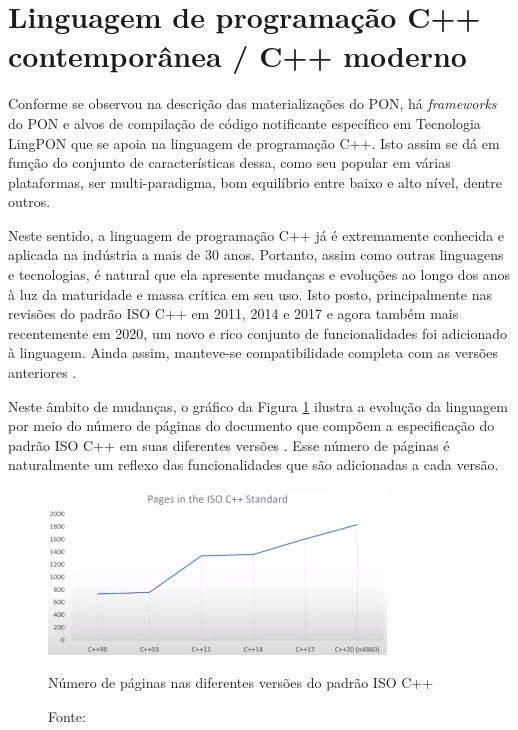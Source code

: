 \section{Linguagem de programação C++ contemporânea / C++ moderno}\label{sec:cpp_moderno}

Conforme se observou na descrição das materializações do PON, há
\textit{frameworks} do PON e alvos de compilação de código notificante
específico em Tecnologia LingPON que se apoia na linguagem de programação C++.
Isto assim se dá em função do conjunto de características dessa, como seu
popular em várias plataformas, ser multi-paradigma, bom equilíbrio entre baixo e
alto nível, dentre outros.

Neste sentido, a linguagem de programação C++ já é extremamente conhecida e
aplicada na indústria a mais de 30 anos. Portanto, assim como outras linguagens
e tecnologias, é natural que ela apresente mudanças e evoluções ao longo dos
anos à luz da maturidade e massa crítica em seu uso. Isto posto, principalmente
nas revisões do padrão ISO C++ em 2011, 2014 e 2017 e agora também mais
recentemente em 2020, um novo e rico conjunto de funcionalidades foi adicionado
à linguagem. Ainda assim, manteve-se compatibilidade completa com as versões
anteriores \cite{bjarne_2020}.

Neste âmbito de mudanças, o gráfico da Figura \ref{fig:iso_cpp} ilustra a
evolução da linguagem por meio do número de páginas do documento que compõem a
especificação do padrão ISO C++ em suas diferentes versões
\cite{iso_cpp17,feldman_2019}. Esse número de páginas é naturalmente um reflexo
das funcionalidades que são adicionadas a cada versão.

\begin{figure}[!htb]
  \centering
  \includegraphics[width=0.8\textwidth]{../figures/iso_cpp.png}
  \smallskip
  \caption{Número de páginas nas diferentes versões do padrão ISO C++}
  \caption*{Fonte: }
  \label{fig:iso_cpp}
\end{figure}

